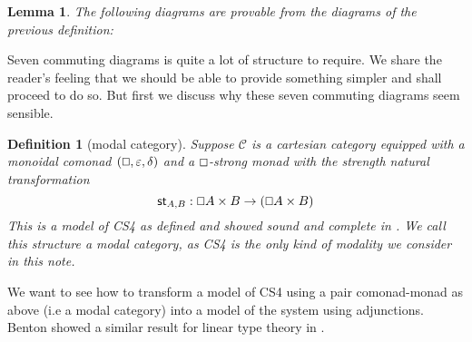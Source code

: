 \documentclass{article}
\let\Diamond\relax
\let\mto\to
\let\to\relax
\newcommand{\to}{\rightarrow}
\renewcommand{\Box}{\oblong}
\newcommand{\cat}[1]{\mathcal{#1}}
\newcommand{\pd}[0]{\times}
\newcommand{\st}[2]{\mathsf{st}_{#1,#2}}
\newcommand{\id}[0]{\mathsf{id}}
\newtheorem{lemma}[theorem]{Lemma}
\newtheorem{definition}[theorem]{Definition}
\begin{document}
\begin{lemma}
  \label{lemma:alternate-mix-diagrams}
  The following diagrams are provable from the diagrams of the
  previous definition:
\end{lemma}


Seven commuting diagrams is quite a lot of structure to require. We share the reader's feeling that we should be able to provide something simpler   and shall proceed to do so. But first we discuss why these seven commuting diagrams seem sensible.

\begin{definition}[modal category]
  \label{def:CS4-model}
  Suppose $\cat{C}$ is a cartesian category equipped with  a monoidal comonad $(\Box, \varepsilon, \delta)$ and a
  \emph{$\Box$-strong monad} with the strength natural transformation
  \[
  \st{A}{B} : \Box A \pd \Diamond B \mto \Diamond(\Box A \pd B)
  \]
  This is a model of CS4 as defined and showed sound and complete in \cite{CS4}. We call this structure a \textit{modal category}, as CS4 is the only kind of modality we consider in this note.
\end{definition}



We want to see how to transform a model of CS4 using a pair comonad-monad as above (i.e a modal category) into a model of the system using adjunctions.  Benton showed a similar result for linear type theory in \cite{benton1995}.
\end{document}
